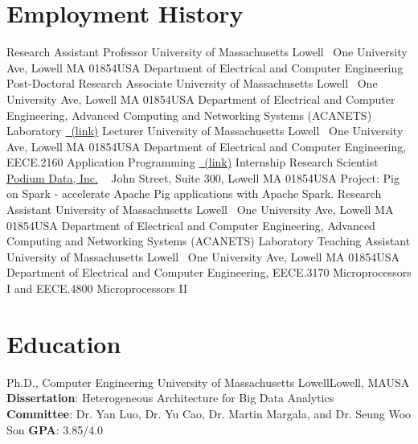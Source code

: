 \documentclass[11pt]{moderncv}
\begin{document}
\section{Employment History}
%
        {Research Assistant Professor}%
        {\small University of Massachusetts Lowell}%
        {\small ~\hfill\break One University Ave, Lowell MA 01854}{USA}%
        {Department of Electrical and Computer Engineering}
%
%
        {Post-Doctoral Research Associate}%
        {\small University of Massachusetts Lowell}%
        {\small ~\hfill\break One University Ave, Lowell MA 01854}{USA}%
        {Department of Electrical and Computer Engineering, \newline
         Advanced Computing and Networking Systems (ACANETS) Laboratory \href{http://acanets.uml.edu/}{\color{color2}\homepagesymbol~(link)}
        }
%
%
        {Lecturer}%
        {\small University of Massachusetts Lowell}%
        {\small ~\hfill\break One University Ave, Lowell MA 01854}{USA}%
        {Department of Electrical and Computer Engineering, \newline
         EECE.2160 Application Programming \href{http://mjgeiger.github.io/eece2160/}{\color{color2}\homepagesymbol~(link)}
        }
%
%
        {Internship Research Scientist}%
        {\small \href{http://www.podiumdata.com/}{Podium Data, Inc.}}%
        {\small ~\hfill{} John Street, Suite 300, Lowell MA 01854}{USA}%
        {Project: Pig on Spark - accelerate Apache Pig applications with Apache Spark.
        }
%
        {Research Assistant}%
        {\small University of Massachusetts Lowell}%
        {\small ~\hfill\break One University Ave, Lowell MA 01854}{USA}%
        {Department of Electrical and Computer Engineering, \newline
         Advanced Computing and Networking Systems (ACANETS) Laboratory
        }
%
%
        {Teaching Assistant}%
        {\small University of Massachusetts Lowell}%
        {\small ~\hfill\break One University Ave, Lowell MA 01854}{USA}%
        {Department of Electrical and Computer Engineering, \newline
         EECE.3170 Microprocessors I and EECE.4800 Microprocessors II
        }

\section{Education}
        {Ph.D., Computer Engineering}
        {University of Massachusetts Lowell}{Lowell, MA}{USA}
        {\textbf{Dissertation}: Heterogeneous Architecture for Big Data Analytics\\
         \textbf{Committee}: Dr. Yan Luo, Dr. Yu Cao, Dr. Martin Margala, and Dr. Seung Woo Son
         \textbf{GPA}: 3.85/4.0}  %
\end{document}
